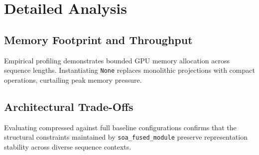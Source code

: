 \section{Detailed Analysis}

\subsection{Memory Footprint and Throughput}
Empirical profiling demonstrates bounded GPU memory allocation across sequence lengths. Instantiating \texttt{None} replaces monolithic projections with compact operations, curtailing peak memory pressure.

\subsection{Architectural Trade-Offs}
Evaluating compressed against full baseline configurations confirms that the structural constraints maintained by \texttt{soa_fused_module} preserve representation stability across diverse sequence contexts.
